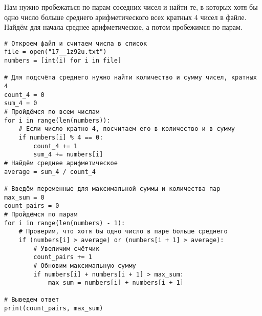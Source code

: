 \documentclass[14pt,a4paper]{article}
\begin{document}
Нам нужно пробежаться по парам соседних чисел и найти те, в которых
хотя бы одно число больше среднего арифметического всех кратных 4
чисел в файле. Найдём для начала среднее арифметическое, а потом
пробежимся по парам.

\begin{verbatim}
# Откроем файл и считаем числа в список
file = open("17__1z92u.txt")
numbers = [int(i) for i in file]

# Для подсчёта среднего нужно найти количество и сумму чисел, кратных 4
count_4 = 0
sum_4 = 0
# Пройдёмся по всем числам
for i in range(len(numbers)):
    # Если число кратно 4, посчитаем его в количество и в сумму
    if numbers[i] % 4 == 0:
        count_4 += 1
        sum_4 += numbers[i]
# Найдём среднее арифметическое
average = sum_4 / count_4

# Введём переменные для максимальной суммы и количества пар
max_sum = 0
count_pairs = 0
# Пройдёмся по парам
for i in range(len(numbers) - 1):
    # Проверим, что хотя бы одно число в паре больше среднего
    if (numbers[i] > average) or (numbers[i + 1] > average):
        # Увеличим счётчик
        count_pairs += 1
        # Обновим максимальную сумму
        if numbers[i] + numbers[i + 1] > max_sum:
            max_sum = numbers[i] + numbers[i + 1]

# Выведем ответ
print(count_pairs, max_sum)

\end{verbatim}
\end{document}
